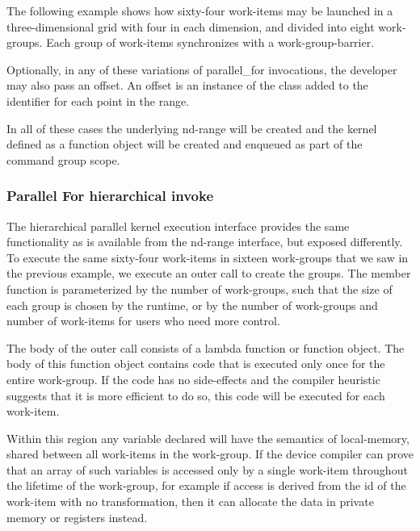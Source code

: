 The following example shows how sixty-four work-items may be launched
in a three-dimensional grid with four in each dimension, and divided
into eight work-groups. Each group of work-items synchronizes with a
\gls{work-group-barrier}.


Optionally, in any of these variations of parallel_for invocations,
the developer may also pass an offset. An offset is an
instance of the  class added to the identifier 
for each point in the range.

In all of these cases the underlying \gls{nd-range} will be created
and the kernel defined as a function object will be created and enqueued
as part of the command group scope.


\subsubsection{Parallel For hierarchical invoke}

The hierarchical parallel kernel execution interface provides the same
functionality as is available from the \gls{nd-range} interface, but
exposed differently. To execute the same sixty-four work-items in
sixteen work-groups that we saw in the previous example, we execute an
outer  call to create the
groups. The member function
 is parameterized by the
number of work-groups, such that the size of each group is chosen by
the runtime, or by the number of work-groups and number of work-items
for users who need more control.

The body of the outer  call
consists of a lambda function or function object. The body of this
function object contains code that is executed only once for the
entire work-group. If the code has no side-effects and the compiler
heuristic suggests that it is more efficient to do so, this code will be
executed for each work-item.

Within this region any variable declared will have the semantics of
\gls{local-memory}, shared between all \glspl{work-item} in the 
\gls{work-group}. If the
device compiler can prove that an array of such variables is accessed only by
a single work-item throughout the lifetime of the work-group, for
example if access is derived from the id of the work-item with no
transformation, then it can allocate the data in private memory or
registers instead.

